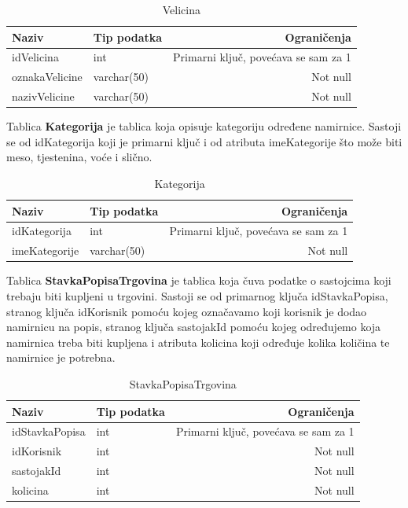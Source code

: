 \documentclass[diplomskirad]{fer}
\begin{document}
\begin{table}[H]
\label{tbl:Velicina}
\centering
\renewcommand{\arraystretch}{1.3}
\begin{tabular}{llr} \hline
Naziv & Tip podatka & Ograničenja\\ \hline
idVelicina & int & Primarni ključ, povećava se sam za 1 \\
oznakaVelicine & varchar(50) & Not null\\
nazivVelicine & varchar(50) & Not null\\
\end{tabular}
\caption{Velicina}
\end{table}

Tablica \textbf{Kategorija} je tablica koja opisuje kategoriju određene namirnice. Sastoji se od idKategorija koji je primarni ključ i od atributa imeKategorije što može biti meso, tjestenina, voće i slično.

\begin{table}[htb]
\label{tbl:Kategorija}
\centering
\renewcommand{\arraystretch}{1.3}
\begin{tabular}{llr} \hline
Naziv & Tip podatka & Ograničenja\\ \hline
idKategorija & int & Primarni ključ, povećava se sam za 1 \\
imeKategorije & varchar(50) & Not null\\
\end{tabular}
\caption{Kategorija}
\end{table}

Tablica \textbf{StavkaPopisaTrgovina} je tablica koja čuva podatke o sastojcima koji trebaju biti kupljeni u trgovini. Sastoji se od primarnog ključa idStavkaPopisa, stranog ključa idKorisnik pomoću kojeg označavamo koji korisnik je dodao namirnicu na popis, stranog ključa sastojakId pomoću kojeg određujemo koja namirnica treba biti kupljena i atributa kolicina koji određuje kolika količina te namirnice je potrebna.


\begin{table}[htb]
\label{tbl:PopisTrgovina}
\centering
\renewcommand{\arraystretch}{1.3}
\begin{tabular}{llr} \hline
Naziv & Tip podatka & Ograničenja\\ \hline
idStavkaPopisa & int & Primarni ključ, povećava se sam za 1 \\
idKorisnik & int & Not null\\
sastojakId & int & Not null\\
kolicina & int & Not null\\
\end{tabular}
\caption{StavkaPopisaTrgovina}
\end{table}
\end{document}
